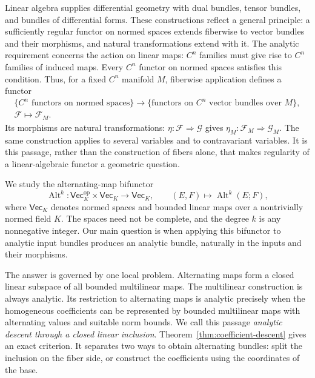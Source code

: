 \documentclass[11pt]{amsart}
\theoremstyle{definition}
\theoremstyle{remark}
\numberwithin{equation}{section}
\newcommand{\Alt}{\operatorname{Alt}}
\begin{document}
Linear algebra supplies differential geometry with dual bundles, tensor bundles, and bundles of
differential forms. These constructions reflect a general principle: a sufficiently regular functor
on normed spaces extends fiberwise to vector bundles and their morphisms, and natural transformations
extend with it. The analytic requirement concerns the action on linear maps: $C^n$ families must
give rise to $C^n$ families of induced maps. Every $C^n$ functor on normed spaces satisfies this
condition. Thus, for a fixed $C^n$ manifold $M$, fiberwise application defines a functor
\[
\begin{gathered}
 \{C^n\text{ functors on normed spaces}\}
 \longrightarrow
 \{\text{functors on }C^n\text{ vector bundles over }M\},\\
 \mathcal F\longmapsto\mathcal F_M.
\end{gathered}
\]
Its morphisms are natural transformations: $\eta\colon\mathcal F\Rightarrow\mathcal G$ gives
$\eta_M\colon\mathcal F_M\Rightarrow\mathcal G_M$. The same construction applies to several variables
and to contravariant variables. It is this passage, rather than the construction of fibers alone, that
makes regularity of a linear-algebraic functor a geometric question.

We study the alternating-map bifunctor
\[
 \Alt^k\colon\mathsf{Vec}_K^{\mathrm{op}}\times\mathsf{Vec}_K\longrightarrow\mathsf{Vec}_K,
 \qquad (E,F)\longmapsto\Alt^k(E;F),
\]
where $\mathsf{Vec}_K$ denotes normed spaces and bounded linear maps over a nontrivially normed field
$K$. The spaces need not be complete, and the degree $k$ is any nonnegative integer. Our main question
is when applying this bifunctor to analytic input bundles produces an analytic bundle, naturally in
the inputs and their morphisms.

The answer is governed by one local problem. Alternating maps form a closed linear subspace of all
bounded multilinear maps. The multilinear construction is always analytic. Its restriction to
alternating maps is analytic precisely when the homogeneous coefficients can be represented by bounded
multilinear maps with alternating values and suitable norm bounds. We call this passage
\emph{analytic descent through a closed linear inclusion}. Theorem~\ref{thm:coefficient-descent}
gives an exact criterion. It separates two ways to obtain alternating bundles: split the inclusion on
the fiber side, or construct the coefficients using the coordinates of the base.
\end{document}
